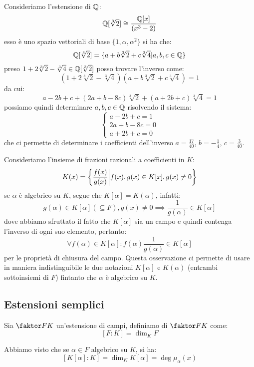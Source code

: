 \documentclass[11pt]{scrartcl}
\begin{document}
\begin{example}
Consideriamo l'estensione di $\mathbb Q$:
	\[ \mathbb Q[\sqrt[3]2] \cong \frac{\mathbb Q[x]}{(x^3-2)}
	\]
esso è uno spazio vettoriali di base $\{1,\alpha,\alpha^2\}$ si ha che:
	\[\mathbb Q[\sqrt[3]2] = \{a+b\sqrt[3]{2}+c\sqrt[3]{4} | a,b,c \in \mathbb Q\}
	\]
preso $1+2\sqrt[3]{2}-\sqrt[3]{4} \in \mathbb Q[\sqrt[3]{2}]$ posso trovare l'inverso come:
	\[ (1+2\sqrt[3]{2}-\sqrt[3]{4})(a+b\sqrt[3]{2}+c\sqrt[3]{4}) = 1
	\]
da cui:
	\[ a-2b+c + (2a + b - 8c)\sqrt[3]{2} + (a+2b+c)\sqrt[3]{4} = 1
	\]
possiamo quindi determinare $a,b,c \in \mathbb Q$ risolvendo il sistema:
	\[\begin{cases}
	a-2b+c =1 \\
	2a + b - 8c = 0\\
	a+2b+c=0
	\end{cases}\]
che ci permette di determinare i coefficienti dell'inverso $a=\frac{17}{40}$, $b=- \frac 14$, $c=\frac{3}{40}$.
\end{example}

\begin{remark}
[$K(\alpha)$]
Consideriamo l'insieme di frazioni razionali a coefficienti in $K$:
	\[ K(x) = \left\{\frac{f(x)}{g(x)} \middle| f(x),g(x) \in K[x], g(x) \ne 0\right\}
	\]
se $\alpha$ è algebrico su $K$, segue che $K[\alpha] = K(\alpha)$, infatti:
	\[ g(\alpha) \in K[\alpha] (\subseteq F), g(x) \ne 0 \implies \frac{1}{g(\alpha)} \in K[\alpha]
	\]	
dove abbiamo sfruttato il fatto che $K[\alpha]$ sia un campo e quindi contenga l'inverso di ogni suo elemento, pertanto:
	\[ \forall f(\alpha) \in K[\alpha]: f(\alpha)  \frac{1}{g(\alpha)} \in K[\alpha]
	\]
per le proprietà di chiusura del campo. Questa osservazione ci permette di usare in maniera indistinguibile le due notazioni $K[\alpha]$ e $K(\alpha)$ (entrambi sottoinsiemi di $F$) fintanto che $\alpha$ è algebrico su $K$.
\end{remark}


\newpage
\subsection{Estensioni semplici}
\begin{definition}
Sia $\faktor FK$ un'estensione di campi, definiamo  di $\faktor FK$ come:
	\[ [F:K] = \dim_KF
	\] 
\end{definition}

\begin{example}
Abbiamo visto che se $\alpha \in F$ algebrico su $K$, si ha:
	\[ \left[K[\alpha]:K\right] = \dim_K K[\alpha] = \deg \mu_\alpha(x)
	\] 
\end{example}
\end{document}
